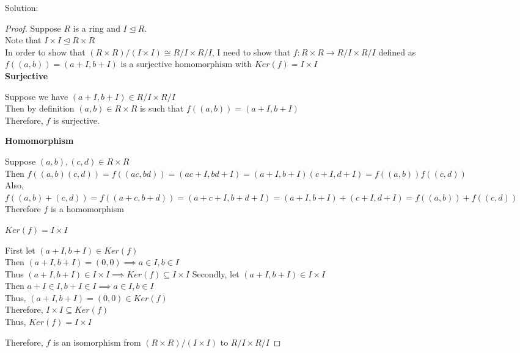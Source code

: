 \documentclass{article} %
\begin{document}
Solution: 
\begin{addmargin}[1em]{0em}
\begin{proof}
Suppose $R$ is a ring and $I \unlhd R$.
\\Note that $I \times I \unlhd R \times R$
\\In order to show that $(R \times R)/(I \times I) \cong R/I \times R/I$, I need to show that $f:R\times R \rightarrow R/I \times R/I$ defined as $f((a,b)) = (a + I, b+I)$ is a surjective homomorphism with $Ker(f) = I \times I$
\\ \textbf{Surjective}
\begin{addmargin}[1em]{0em}
Suppose we have $(a + I, b +I) \in R/I \times R/I$
\\Then by definition $(a,b) \in R \times R$ is such that $f((a,b)) = (a+I,b+I)$
\\Therefore, $f$ is surjective.
\end{addmargin}
\textbf{Homomorphism}
\begin{addmargin}[1em]{0em}
Suppose $(a,b), (c,d) \in R \times R$
\\Then $f((a,b)(c,d))= f((ac,bd)) = (ac + I, bd +I) = (a+I,b+I)(c+I,d+I)=f((a,b))f((c,d))$
\\Also, $f((a,b)+(c,d))=f((a+c,b+d)) = (a+c + I, b+d+I) = (a+I,b+I) + (c+I,d+I) = f((a,b)) + f((c,d))$
\\Therefore $f$ is a homomorphism
\end{addmargin}
\underline{$Ker(f) = I \times I$}
\begin{addmargin}[1em]{0em}
First let $(a+I, b+I) \in Ker(f)$
\\Then $(a + I, b + I) = (0,0) \implies a \in I, b \in I$
\\Thus $(a+I,b+I) \in I \times I \implies Ker(f) \subseteq I \times I$
Secondly, let $(a+I, b+I) \in I \times I$
\\Then $a + I \in I, b + I \in I \implies a \in I, b \in I$
\\Thus, $(a + I, b + I) = (0, 0) \in Ker(f)$
\\Therefore, $I \times I \subseteq Ker(f)$
\\Thus, $Ker(f) = I \times I$
\end{addmargin}
Therefore, $f$ is an isomorphism from $(R \times R)/(I \times I)$ to $R/I \times R/I$
\end{proof}
\end{addmargin}

\newpage
\end{document}
